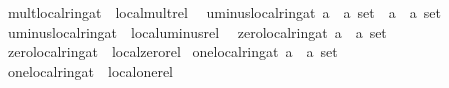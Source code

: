 \documentclass[12pt]{scrartcl}
\begin{document}
\begin{isabelle}
\ \ \ {\isachardoublequoteopen}mult{\isacharunderscore}{\kern0pt}local{\isacharunderscore}{\kern0pt}ring{\isacharunderscore}{\kern0pt}at\ {\isasymequiv}\ local{\isachardot}{\kern0pt}mult{\isacharunderscore}{\kern0pt}rel\ {\isachardoublequoteclose}\isanewline
\isanewline
{}\isamarkupfalse%
\ uminus{\isacharunderscore}{\kern0pt}local{\isacharunderscore}{\kern0pt}ring{\isacharunderscore}{\kern0pt}at{\isacharcolon}{\kern0pt}{\isacharcolon}{\kern0pt}\ {\isachardoublequoteopen}{\isacharparenleft}{\kern0pt}{\isacharprime}{\kern0pt}a\ {\isasymtimes}\ {\isacharprime}{\kern0pt}a{\isacharparenright}{\kern0pt}\ set\ {\isasymRightarrow}\ {\isacharparenleft}{\kern0pt}{\isacharprime}{\kern0pt}a\ {\isasymtimes}\ {\isacharprime}{\kern0pt}a{\isacharparenright}{\kern0pt}\ set{\isachardoublequoteclose}\isanewline
\ \ \ {\isachardoublequoteopen}uminus{\isacharunderscore}{\kern0pt}local{\isacharunderscore}{\kern0pt}ring{\isacharunderscore}{\kern0pt}at\ {\isasymequiv}\ local{\isachardot}{\kern0pt}uminus{\isacharunderscore}{\kern0pt}rel\ {\isachardoublequoteclose}\isanewline
\isanewline
{}\isamarkupfalse%
\ zero{\isacharunderscore}{\kern0pt}local{\isacharunderscore}{\kern0pt}ring{\isacharunderscore}{\kern0pt}at{\isacharcolon}{\kern0pt}{\isacharcolon}{\kern0pt}\ {\isachardoublequoteopen}{\isacharparenleft}{\kern0pt}{\isacharprime}{\kern0pt}a\ {\isasymtimes}\ {\isacharprime}{\kern0pt}a{\isacharparenright}{\kern0pt}\ set{\isachardoublequoteclose}\isanewline
\ \ \ {\isachardoublequoteopen}zero{\isacharunderscore}{\kern0pt}local{\isacharunderscore}{\kern0pt}ring{\isacharunderscore}{\kern0pt}at\ {\isasymequiv}\ local{\isachardot}{\kern0pt}zero{\isacharunderscore}{\kern0pt}rel{\isachardoublequoteclose}\isanewline
\isanewline
{}\isamarkupfalse%
\ one{\isacharunderscore}{\kern0pt}local{\isacharunderscore}{\kern0pt}ring{\isacharunderscore}{\kern0pt}at{\isacharcolon}{\kern0pt}{\isacharcolon}{\kern0pt}\ {\isachardoublequoteopen}{\isacharparenleft}{\kern0pt}{\isacharprime}{\kern0pt}a\ {\isasymtimes}\ {\isacharprime}{\kern0pt}a{\isacharparenright}{\kern0pt}\ set{\isachardoublequoteclose}\isanewline
\ \ \ {\isachardoublequoteopen}one{\isacharunderscore}{\kern0pt}local{\isacharunderscore}{\kern0pt}ring{\isacharunderscore}{\kern0pt}at\ {\isasymequiv}\ local{\isachardot}{\kern0pt}one{\isacharunderscore}{\kern0pt}rel{\isachardoublequoteclose}\isanewline
\isanewline
{}
\end{isabelle}
\end{document}
